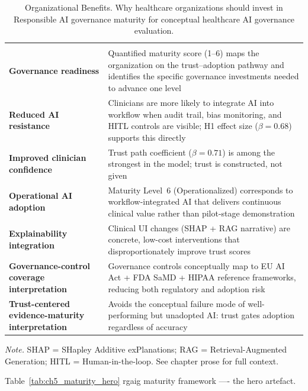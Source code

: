 {\tablestripes\tablefontsize
\begin{xltabular}{\textwidth}{@{} >{\raggedright\arraybackslash}p{2.8cm} L @{}}
\caption[Organizational Benefits]{Organizational Benefits. Why healthcare organizations should invest in Responsible AI governance maturity for conceptual healthcare AI governance evaluation.}\label{tab:ch5_org_benefits} \\
\toprule
{} &  \\
\midrule
\endfirsthead
\toprule
{} &  \\
\midrule
\endhead
\bottomrule
\endlastfoot
\textbf{Governance readiness}     & Quantified maturity score (1--6) maps the organization on the trust--adoption pathway and identifies the specific governance investments needed to advance one level \\
\textbf{Reduced AI resistance}    & Clinicians are more likely to integrate AI into workflow when audit trail, bias monitoring, and HITL controls are visible; H1 effect size ($\beta=0.68$) supports this directly \\
\textbf{Improved clinician confidence} & Trust path coefficient ($\beta=0.71$) is among the strongest in the model; trust is constructed, not given \\
\textbf{Operational AI adoption}  & Maturity Level~6 (Operationalized) corresponds to workflow-integrated AI that delivers continuous clinical value rather than pilot-stage demonstration \\
\textbf{Explainability integration} & Clinical UI changes (SHAP + RAG narrative) are concrete, low-cost interventions that disproportionately improve trust scores \\
\textbf{Governance-control coverage interpretation}        & Governance controls conceptually map to EU AI Act + FDA SaMD + HIPAA reference frameworks, reducing both regulatory and adoption risk \\
\textbf{Trust-centered evidence-maturity interpretation} & Avoids the conceptual failure mode of well-performing but unadopted AI: trust gates adoption regardless of accuracy \\
\end{xltabular}}
\vspace{0.3em}\noindent\textit{Note.} SHAP = SHapley Additive exPlanations; RAG = Retrieval-Augmented Generation; HITL = Human-in-the-loop. See chapter prose for full context.

\noindent Table~\ref{tab:ch5_maturity_hero} rgaig maturity framework ---- the hero artefact.

